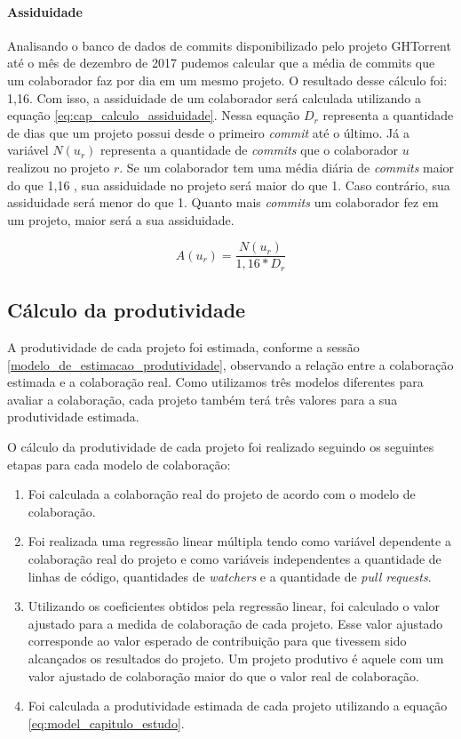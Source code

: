 \paragraph{Assiduidade}

Analisando o banco de dados de commits disponibilizado pelo projeto GHTorrent até o mês de dezembro de 2017 pudemos calcular que a média de commits que um colaborador faz por dia em um mesmo projeto. O resultado desse cálculo foi: 1,16. Com isso, a assiduidade de um colaborador será calculada utilizando a equação \ref{eq:cap_calculo_assiduidade}. Nessa equação $D_r$ representa a quantidade de dias que um projeto possui desde o primeiro \textit{commit} até o último.  Já a variável $N(u_r)$ representa a quantidade de \textit{commits} que o colaborador $u$ realizou no projeto $r$. Se um colaborador tem uma média diária de \textit{commits} maior do que 1,16 , sua assiduidade no projeto será maior do que 1. Caso contrário, sua assiduidade será menor do que 1. Quanto mais \textit{commits} um colaborador fez em um projeto, maior será a sua assiduidade. 

\begin{equation}
\label{eq:cap_calculo_assiduidade}
A(u_r) =  \frac{N(u_r)}{1,16 * D_r}
\end{equation}

\subsection{Cálculo da produtividade}

A produtividade de cada projeto foi estimada, conforme a sessão \ref{modelo_de_estimacao_produtividade}, observando a relação entre a colaboração estimada e a colaboração real. Como utilizamos três modelos diferentes para avaliar a colaboração, cada projeto também terá três valores para a sua produtividade estimada.

O cálculo da produtividade de cada projeto foi realizado seguindo os seguintes etapas para cada modelo de colaboração:

\begin{enumerate}
\item Foi calculada a colaboração real do projeto de acordo com o modelo de colaboração.
\item Foi realizada uma regressão linear múltipla tendo como variável dependente a colaboração real do projeto e como variáveis independentes a quantidade de linhas de código, quantidades de \textit{watchers} e a quantidade de \textit{pull requests}.
\item Utilizando os coeficientes obtidos pela regressão linear, foi calculado o valor ajustado para a medida de colaboração de cada projeto. Esse valor ajustado corresponde ao valor esperado de contribuição para que tivessem sido alcançados os resultados do projeto. Um projeto produtivo é aquele com um valor ajustado de colaboração maior do que o valor real de colaboração.
\item Foi calculada a produtividade estimada de cada projeto utilizando a equação \ref{eq:model_capitulo_estudo}.
\end{enumerate}

